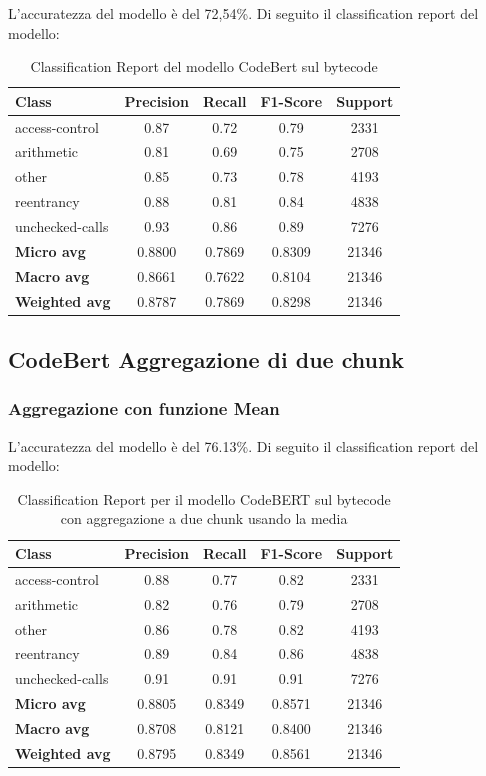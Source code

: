 \documentclass[../../Thesis.tex]{subfiles}
\begin{document}
L'accuratezza del modello \`e del 72,54\%. Di seguito il classification report del modello: 
\begin{table}[H]
\centering
\small
\begin{tabular}{lcccc}
\hline
\textbf{Class} & \textbf{Precision} & \textbf{Recall} & \textbf{F1-Score} & \textbf{Support} \\
\hline
access-control & 0.87 & 0.72 & 0.79 & 2331 \\
arithmetic & 0.81 & 0.69 & 0.75 & 2708 \\
other & 0.85 & 0.73 & 0.78 & 4193 \\
reentrancy & 0.88 & 0.81 & 0.84 & 4838 \\
unchecked-calls & 0.93 & 0.86 & 0.89 & 7276 \\
\hline
\textbf{Micro avg} & 0.8800 & 0.7869 & 0.8309 & 21346 \\
\textbf{Macro avg} & 0.8661 & 0.7622 & 0.8104 & 21346 \\
\textbf{Weighted avg} & 0.8787 & 0.7869 & 0.8298 & 21346 \\
\hline
\end{tabular}
\caption{Classification Report del modello CodeBert sul bytecode}
\end{table}

\subsection{CodeBert Aggregazione di due chunk}
\subsubsection{Aggregazione con funzione Mean}
L'accuratezza del modello \`e del 76.13\%. Di seguito il classification report del modello:
\begin{table}[H]
    \centering
    \small
    \begin{tabular}{lcccc}
    \hline
    \textbf{Class} & \textbf{Precision} & \textbf{Recall} & \textbf{F1-Score} & \textbf{Support} \\
    \hline
    access-control & 0.88 & 0.77 & 0.82 & 2331 \\
    arithmetic & 0.82 & 0.76 & 0.79 & 2708 \\
    other & 0.86 & 0.78 & 0.82 & 4193 \\
    reentrancy & 0.89 & 0.84 & 0.86 & 4838 \\
    unchecked-calls & 0.91 & 0.91 & 0.91 & 7276 \\
    \hline
    \textbf{Micro avg} & 0.8805 & 0.8349 & 0.8571 & 21346 \\
    \textbf{Macro avg} & 0.8708 & 0.8121 & 0.8400 & 21346 \\
    \textbf{Weighted avg} & 0.8795 & 0.8349 & 0.8561 & 21346 \\
    \hline
    \end{tabular}
    \caption{Classification Report per il modello CodeBERT sul bytecode con aggregazione a due chunk usando la media}
    \end{table}
    
\end{document}
